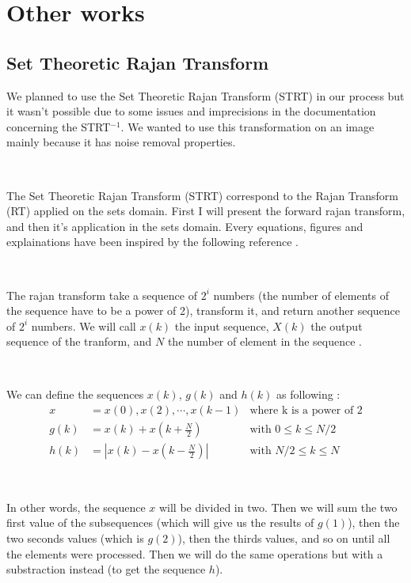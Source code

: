 \chapter{Other works}


\section{Set Theoretic Rajan Transform}

We planned to use the Set Theoretic Rajan Transform (STRT) in our process but it wasn't possible due to some issues and imprecisions in the documentation concerning the STRT$^{-1}$. We wanted to use this transformation on an image mainly because it has noise removal properties.

~~

The Set Theoretic Rajan Transform (STRT) correspond to the Rajan Transform (RT) applied on the sets domain. First I will present the forward rajan transform, and then it's application in the sets domain. Every equations, figures and explainations have been inspired by the following reference  \cite{bib:symbolic:RajanTransform}.

~~

The rajan transform take a sequence of $2^{i}$ numbers (the number of elements of the sequence have to be a power of 2), transform it, and return another sequence of $2^{i}$ numbers. We will call $x(k)$ the input sequence, $X(k)$ the output sequence of the tranform, and $N$ the number of element in the sequence \cite{bib:symbolic:RajanTransform}. 

~~

We can define the sequences $x(k)$, $g(k)$ and $h(k)$ as following : 
\begin{align}
x &= x(0), x(2), \cdots, x(k-1) & \text{where k is a power of 2} \\
g(k) &= x(k) + x(k + \frac{N}{2}) & \text{with } 0 \leq k \leq N / 2 \\
h(k) &= | x(k) - x(k - \frac{N}{2}) | & \text{with } N / 2 \leq k \leq N
\end{align}

~~

In other words, the sequence $x$ will be divided in two. Then we will sum the two first value of the subsequences (which will give us the results of $g(1)$), then the two seconds values (which is $g(2)$), then the thirds values, and so on until all the elements were processed. Then we will do the same operations but with a substraction instead (to get the sequence $h$).

